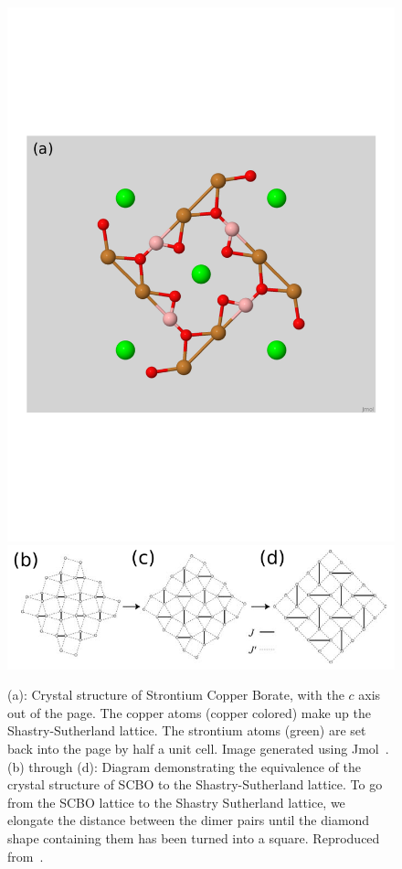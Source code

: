 \documentclass{thesis-umich}
\begin{document}
\begin{figure}
	\caption[Crystal structure of strontium copper borate]{(a): Crystal structure of Strontium Copper Borate, with the $c$ axis out of the page. The copper atoms (copper colored) make up the Shastry-Sutherland lattice. The strontium atoms (green) are set back into the page by half a unit cell. Image generated using Jmol~\cite{jmol}. (b) through (d): Diagram demonstrating the equivalence of the crystal structure of SCBO to the Shastry-Sutherland lattice. To go from the SCBO lattice to the Shastry Sutherland lattice, we elongate the distance between the dimer pairs until the diamond shape containing them has been turned into a square. Reproduced from~\cite{Kageyama2005}.}
	\label{fig:scbo_crystal}
	\includegraphics[width=\columnwidth,trim={0 2.5in 0 2.5in},clip]{figures/scbo.pdf}
	\includegraphics[width=\columnwidth]{figures/scbo_to_ss_kageyama.pdf}
\end{figure}
\end{document}
